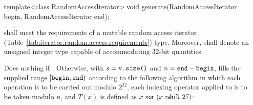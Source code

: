 %
%
\begin{itemdecl}
template<class RandomAccessIterator>
  void generate(RandomAccessIterator begin, RandomAccessIterator end);
\end{itemdecl}

\begin{itemdescr}
\pnum\requires {}
  shall meet the requirements of a mutable random access iterator
  (Table~\ref{tab:iterator.random.access.requirements}) type.
  Moreover,
  shall denote an unsigned integer type
  capable of accommodating 32-bit quantities.

\pnum\effects
 Does nothing if .
 Otherwise,
 with $ s = \texttt{v.size()} $
 and  $ n = \texttt{end} - \texttt{begin} $,
 fills the supplied range $[\texttt{begin},\texttt{end})$
 according to the following algorithm
 in which
 each operation is to be carried out modulo $2^{32}$,
 each indexing operator applied to  is to be taken modulo $n$,
 and $T(x)$ is defined as $ x \, \, \mathsf{xor} \, \, (x \, \, \mathsf{rshift} \, \, 27)$:


\end{itemdescr}
